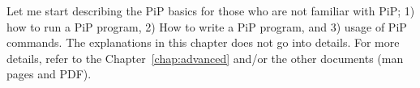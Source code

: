 
Let me start describing the PiP basics for those who are not
familiar with PiP; 1) how to run a PiP program, 2) How to write a PiP
program, and 3) usage of PiP commands. The explanations in this
chapter does not go into details. For more details, refer to the 
Chapter~\ref{chap:advanced} and/or the other documents (man pages and
PDF). 
